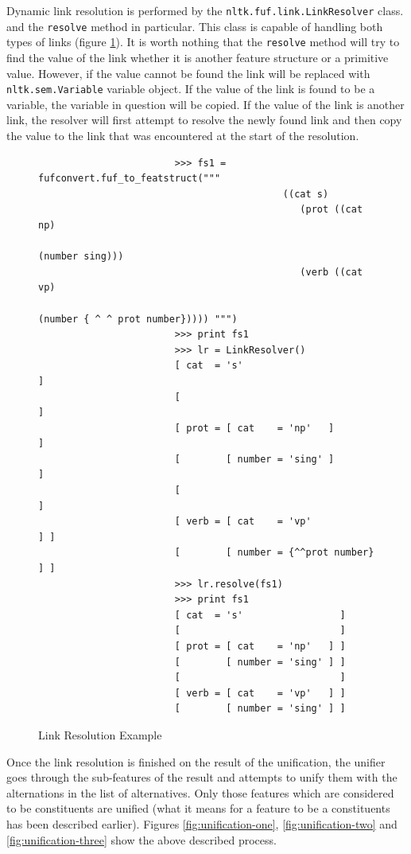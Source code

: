 \documentclass[12pt]{article}
\begin{document}
{Dynamic link resolution is performed by the \texttt{nltk.fuf.link.LinkResolver} class. and the \texttt{resolve}
method in particular. This class is capable of handling both types of links (figure \ref{fig:link-resolver}). It is worth nothing that the 
\texttt{resolve} method will try to find the value of the link whether it is another feature structure
or a primitive value. However, if the value cannot be found the link will be replaced with \texttt{nltk.sem.Variable}
variable object. If the value of the link is found to be a variable, the variable in question will
be copied. If the value of the link is another link, the resolver will first attempt to resolve the newly
found link and then copy the value to the link that was encountered at the start of the resolution.
\begin{figure}[h!]
{\scriptsize
    \begin{verbatim}
                        >>> fs1 = fufconvert.fuf_to_featstruct("""
                                           ((cat s)
                                              (prot ((cat np)
                                                      (number sing)))
                                              (verb ((cat vp)
                                                      (number { ^ ^ prot number})))) """)
                        >>> print fs1
                        >>> lr = LinkResolver()
                        [ cat  = 's'                          ]
                        [                                     ]
                        [ prot = [ cat    = 'np'   ]          ]
                        [        [ number = 'sing' ]          ]
                        [                                     ]
                        [ verb = [ cat    = 'vp'            ] ]
                        [        [ number = {^^prot number} ] ]
                        >>> lr.resolve(fs1)
                        >>> print fs1
                        [ cat  = 's'                 ]
                        [                            ]
                        [ prot = [ cat    = 'np'   ] ]
                        [        [ number = 'sing' ] ]
                        [                            ]
                        [ verb = [ cat    = 'vp'   ] ]
                        [        [ number = 'sing' ] ]
\end{verbatim}
}
\caption{Link Resolution Example}
\label{fig:link-resolver}
\end{figure}


Once the link resolution is finished on the result of the unification, the unifier goes through the sub-features 
of the result
and attempts to unify them with the alternations in the list of alternatives. Only those features which are considered 
to be constituents are unified (what it means for a feature to be a constituents has been described earlier).
Figures \ref{fig:unification-one}, \ref{fig:unification-two} and \ref{fig:unification-three} show the above
described process.

}
\end{document}
